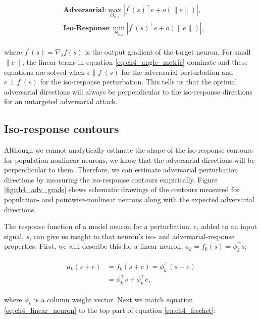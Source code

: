\begin{align}\label{eq:ch4_angle_metric}
\begin{split}
    &\textbf{Adversarial:} \max_{\Theta_{e,s}} |f^{\prime}(s)^\top e + o(\|e\|)|,\\
    &\textbf{Iso-Response:} \min_{\Theta_{e,s}} |f^{\prime}(s)^\top e + o(\|e\|)|,
\end{split}
\end{align}

where $f^{\prime}(s) = \nabla_{s}f(s)$ is the output gradient of the target neuron. For small $\|e\|$, the linear terms in equation \ref{eq:ch4_angle_metric} dominate and these equations are solved when $e \parallel f^{\prime}(s)$ for the adversarial perturbation and $e \perp f^{\prime}(s)$ for the iso-response perturbation. This tells us that the optimal adversarial directions will always be perpendicular to the iso-response directions for an untargeted adversarial attack. 

\subsection{Iso-response contours}
Although we cannot analytically estimate the shape of the iso-response contours for population nonlinear neurons, we know that the adversarial directions will be perpendicular to them. Therefore, we can estimate adversarial perturbation directions by measuring the iso-response contours empirically. Figure \ref{fig:ch4_adv_grads} shows schematic drawings of the contours measured for population- and pointwise-nonlinear neurons along with the expected adversarial directions.

The response function of a model neuron for a perturbation, $e$, added to an input signal, $s$, can give us insight to that neuron's iso- and adversarial-response properties. First, we will describe this for a linear neuron, $a_{k}=f_{k}(s)=\phi_{k}^\top s$:

\begin{align}\label{eq:ch4_linear_neuron}
\begin{split}
    a_{k}(s+e) &= f_{k}(s+e) = \phi_{k}^\top (s + e) \\
    &= \phi_{k}^\top s +\phi_{k}^\top e,
\end{split}
\end{align}

where $\phi_{k}$ is a column weight vector. Next we match equation \ref{eq:ch4_linear_neuron} to the top part of equation \ref{eq:ch4_frechet}:

